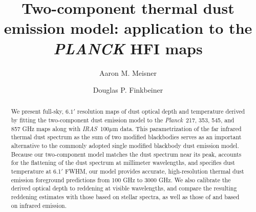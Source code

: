 \documentclass{emulateapj}
\newcommand{\IRAS}{{\it IRAS}}
\newcommand{\PLANCK}{{\it Planck}}
\begin{document}
\title{Two-component thermal dust emission model: application to the 
{\it PLANCK} HFI maps}
\author{Aaron M. Meisner}
\author{Douglas P. Finkbeiner}

\begin{abstract}
We present full-sky, $6.1'$ resolution maps of dust optical depth and 
temperature derived by fitting the \cite{FDS99} two-component dust emission 
model to the \PLANCK~217, 353, 545, and 857 GHz maps along with  
\IRAS~100$\mu$m data. This parametrization of the far infrared thermal dust 
spectrum as the sum of two modified blackbodies serves as an important 
alternative to the commonly adopted single modified blackbody dust emission 
model. Because our two-component model matches the dust spectrum near its 
peak, accounts for the flattening of the dust spectrum at millimeter 
wavelengths, and specifies dust temperature at 6.1$'$ FWHM, our model 
provides accurate, high-resolution thermal dust emission foreground predictions
 from 100 GHz to 3000 GHz. We also calibrate the derived optical depth to 
reddening at visible wavelengths, and compare the resulting reddening estimates
with those based on stellar spectra, as well as those of \cite{SFD} and 
\cite{planckdust} based on infrared emission.



\end{abstract}
\end{document}
